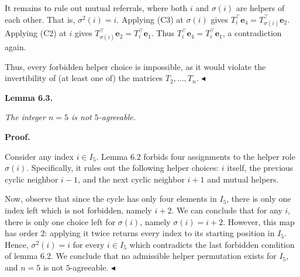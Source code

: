 It remains to rule out mutual referrals, where both $i$ and $\sigma(i)$ are helpers of each other. That is, $\sigma^{2}(i)=i$. Applying (C3) at $\sigma(i)$ gives $T_{i}^{\top}\mathbf{e}_{4}=T_{\sigma(i)}^{\top}\mathbf{e}_{2}$. Applying (C2) at $i$ gives $T_{\sigma(i)}^{\top}\mathbf{e}_{2}=T_{i}^{\top}\mathbf{e}_{1}$. Thus $T_{i}^{\top}\mathbf{e}_{4}=T_{i}^{\top}\mathbf{e}_{1}$, a contradiction again.\par




Thus, every forbidden helper choice is impossible, as it would violate the invertibility of (at least one of) the matrices $T_{2},\ldots,T_{n}$.
$\blacktriangleleft$\par





\par\medskip\noindent\textbf{
\textbf{Lemma 6.3}\textbf{.}
}\par



\emph{The integer $n=5$ is not $5$-agreeable.}\par







\par\medskip\noindent\textbf{Proof.}\par




Consider any index $i\in I_{5}$. Lemma 6.2 forbids four assignments to the helper role $\sigma(i)$. Specifically, it rules out the following helper choices: $i$ itself, the previous cyclic neighbor $i-1$, and the next cyclic neighbor $i+1$ and mutual helpers.\par




Now, observe that since the cycle has only four elements in $I_{5}$, there is only one index left which is not forbidden, namely $i+2$.
We can conclude that for any $i$, there is only one choice left for $\sigma(i)$, namely $\sigma(i)=i+2$. However, this map has order 2: applying it twice returns every index to its starting position in $I_{5}$. Hence, $\sigma^{2}(i)=i$ for every $i\in I_{5}$ which contradicts the last forbidden condition of lemma 6.2.
We conclude that no admissible helper permutation exists for $I_{5}$, and $n=5$ is not $5$-agreeable.
$\blacktriangleleft$\par



